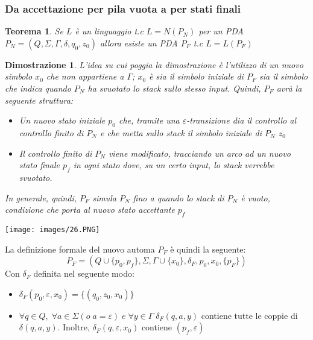 \documentclass[12pt]{article}
\newtheorem{Teorema}{Teorema}[subsection]
\newtheorem{Dimostrazione}{Dimostrazione}[subsection]
\begin{document}
\subsubsection{Da accettazione per pila vuota a per stati finali}
\begin{Teorema}
    Se $L$ è un linguaggio t.c $L = N(P_N)$ per un PDA $P_N = (Q, \Sigma, \Gamma, \delta, q_0, z_0)$ allora esiste un PDA $P_F$ t.c $L = L(P_F)$ 
\end{Teorema}
\begin{Dimostrazione}
    L'idea su cui poggia la dimostrazione è l'utilizzo di un nuovo simbolo $x_0$ che non appartiene a $\Gamma$; $x_0$ è sia il simbolo iniziale di $P_F$ sia il simbolo che indica quando $P_N$ ha svuotato lo stack sullo stesso input. Quindi, $P_F$ avrà la seguente struttura:
    \begin{itemize}
        \item Un nuovo stato iniziale $p_0$ che, tramite una $\varepsilon$-transizione dia il controllo al controllo finito di $P_N$ e che metta sullo stack il simbolo iniziale di $P_N$ $z_0$
        \item Il controllo finito di $P_N$ viene modificato, tracciando un arco ad un nuovo stato finale $p_f$ in ogni stato dove, su un certo input, lo stack verrebbe svuotato.
    \end{itemize}
    In generale, quindi, $P_F$ simula $P_N$ fino a quando lo stack di $P_N$ è vuoto, condizione che porta al nuovo stato accettante $p_f$
\end{Dimostrazione}
\begin{center}
    \texttt{[image: images/26.PNG]}
\end{center}
La definizione formale del nuovo automa $P_F$ è quindi la seguente:
$$P_F = (Q \cup \{p_0, p_f\}, \Sigma, \Gamma \cup \{x_0\}, \delta_F, p_0, x_0, \{p_F\})$$
Con $\delta_F$ definita nel seguente modo:
\begin{itemize}
    \item $\delta_F(p_0, \varepsilon, x_0) = \{(q_0, z_0,x_0)\}$
    \item $\forall q \in Q, \; \forall a \in \Sigma (o \; a = \varepsilon) \; e \; \forall y \in \Gamma \; \delta_F(q, a, y)$ contiene tutte le coppie di $\delta(q, a, y)$. Inoltre, $\delta_F(q, \varepsilon, x_0)$ contiene $(p_f, \varepsilon)$
\end{itemize}
\end{document}
